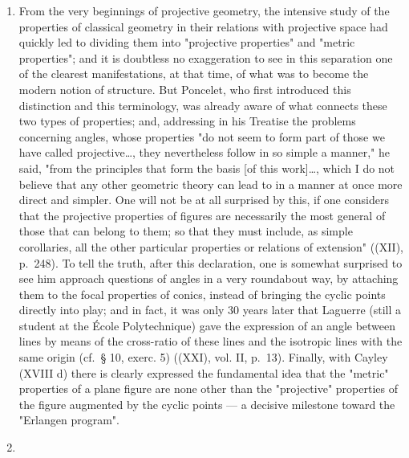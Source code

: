 \begin{enumerate}
\item
  From the very beginnings of projective geometry, the intensive study of the properties of classical geometry in their relations with projective space had quickly led to dividing them into "projective properties" and "metric properties"; and it is doubtless no exaggeration to see in this separation one of the clearest manifestations, at that time, of what was to become the modern notion of structure. But Poncelet, who first introduced this distinction and this terminology, was already aware of what connects these two types of properties; and, addressing in his Treatise the problems concerning angles, whose properties "do not seem to form part of those we have called projective\ldots, they nevertheless follow in so simple a manner," he said, "from the principles that form the basis {[}of this work{]}\ldots, which I do not believe that any other geometric theory can lead to in a manner at once more direct and simpler. One will not be at all surprised by this, if one considers that the projective properties of figures are necessarily the most general of those that can belong to them; so that they must include, as simple corollaries, all the other particular properties or relations of extension" ((XII), p.~248). To tell the truth, after this declaration, one is somewhat surprised to see him approach questions of angles in a very roundabout way, by attaching them to the focal properties of conics, instead of bringing the cyclic points directly into play; and in fact, it was only 30 years later that Laguerre (still a student at the École Polytechnique) gave the expression of an angle between lines by means of the cross-ratio of these lines and the isotropic lines with the same origin (cf.~§ 10, exerc. 5) ((XXI), vol. II, p.~13). Finally, with Cayley (XVIII d) there is clearly expressed the fundamental idea that the "metric" properties of a plane figure are none other than the "projective" properties of the figure augmented by the cyclic points --- a decisive milestone toward the "Erlangen program".
\item

\end{enumerate}
